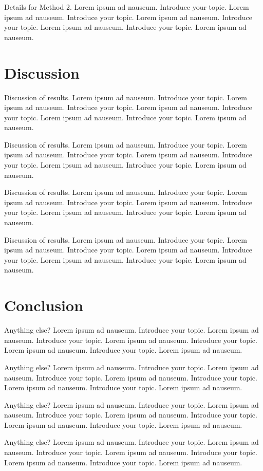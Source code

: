 \documentclass{bioinfo}
\begin{document}
Details for Method 2. Lorem ipsum ad nauseum. Introduce your topic.
Lorem ipsum ad nauseum. Introduce your topic. Lorem ipsum ad nauseum.
Introduce your topic. Lorem ipsum ad nauseum. Introduce your topic.
Lorem ipsum ad nauseum.

\section{Discussion}

Discussion of results. Lorem ipsum ad nauseum. Introduce your topic.
Lorem ipsum ad nauseum. Introduce your topic. Lorem ipsum ad nauseum.
Introduce your topic. Lorem ipsum ad nauseum. Introduce your topic.
Lorem ipsum ad nauseum.

Discussion of results. Lorem ipsum ad nauseum. Introduce your topic.
Lorem ipsum ad nauseum. Introduce your topic. Lorem ipsum ad nauseum.
Introduce your topic. Lorem ipsum ad nauseum. Introduce your topic.
Lorem ipsum ad nauseum.

Discussion of results. Lorem ipsum ad nauseum. Introduce your topic.
Lorem ipsum ad nauseum. Introduce your topic. Lorem ipsum ad nauseum.
Introduce your topic. Lorem ipsum ad nauseum. Introduce your topic.
Lorem ipsum ad nauseum.

Discussion of results. Lorem ipsum ad nauseum. Introduce your topic.
Lorem ipsum ad nauseum. Introduce your topic. Lorem ipsum ad nauseum.
Introduce your topic. Lorem ipsum ad nauseum. Introduce your topic.
Lorem ipsum ad nauseum.

\section{Conclusion}

Anything else? Lorem ipsum ad nauseum. Introduce your topic. Lorem ipsum
ad nauseum. Introduce your topic. Lorem ipsum ad nauseum. Introduce your
topic. Lorem ipsum ad nauseum. Introduce your topic. Lorem ipsum ad
nauseum.

Anything else? Lorem ipsum ad nauseum. Introduce your topic. Lorem ipsum
ad nauseum. Introduce your topic. Lorem ipsum ad nauseum. Introduce your
topic. Lorem ipsum ad nauseum. Introduce your topic. Lorem ipsum ad
nauseum.

Anything else? Lorem ipsum ad nauseum. Introduce your topic. Lorem ipsum
ad nauseum. Introduce your topic. Lorem ipsum ad nauseum. Introduce your
topic. Lorem ipsum ad nauseum. Introduce your topic. Lorem ipsum ad
nauseum.

Anything else? Lorem ipsum ad nauseum. Introduce your topic. Lorem ipsum
ad nauseum. Introduce your topic. Lorem ipsum ad nauseum. Introduce your
topic. Lorem ipsum ad nauseum. Introduce your topic. Lorem ipsum ad
nauseum.
\end{document}
